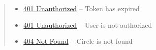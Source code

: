 \documentclass[letterpaper,10pt,english]{sphinxmanual}
\begin{document}
\begin{fulllineitems}
\begin{quote}
\begin{description}
\begin{itemize}
\item {} 
\href{http://www.w3.org/Protocols/rfc2616/rfc2616-sec10.html\#sec10.4.2}{401 Unauthorized} -- Token has expired

\item {} 
\href{http://www.w3.org/Protocols/rfc2616/rfc2616-sec10.html\#sec10.4.2}{401 Unauthorized} -- User is not authorized

\item {} 
\href{http://www.w3.org/Protocols/rfc2616/rfc2616-sec10.html\#sec10.4.5}{404 Not Found} -- Circle is not found

\end{itemize}

\end{description}\end{quote}

\end{fulllineitems}
\end{document}
